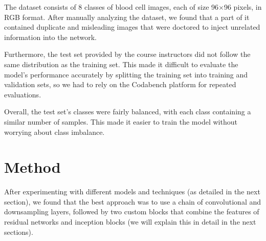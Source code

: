 \documentclass[11pt]{article}
\begin{document}
\begin{multicols}{2}

      The dataset consists of 8 classes of blood cell images, each of size
      96\(\times\)96
      pixels, in RGB format. After manually analyzing the dataset, we found
      that
      a part of it contained duplicate and misleading images that were doctored
      to inject unrelated information into the network.

      Furthermore, the test set provided by the course instructors did not
      follow
      the same distribution as the training set. This made it difficult to
      evaluate the model's performance accurately by splitting the training set
      into training and validation sets, so we had to rely on the Codabench
      platform for repeated evaluations.

      Overall, the test set's classes were fairly balanced, with each class
      containing a similar number of samples. This made it easier to train the
      model without worrying about class imbalance.

      \section{Method}



      After experimenting with different models and techniques (as detailed in
      the next section), we found that the best approach was to use a chain of
      convolutional and downsampling layers, followed by two custom blocks that
      combine the features of residual networks and inception blocks (we will
      explain this in detail in the next sections).


\end{multicols}
\end{document}
